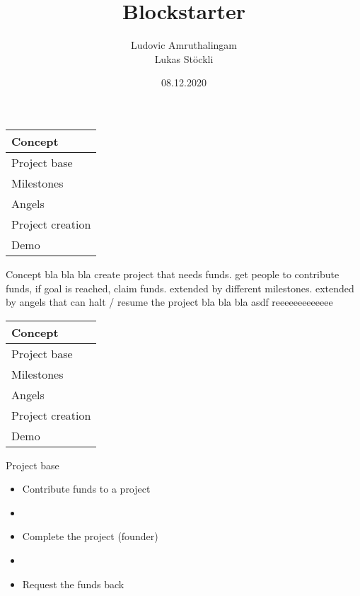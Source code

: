 \documentclass{beamer}
\title              {Blockstarter}
\author             {Ludovic Amruthalingam\\Lukas Stöckli}
\institute          {University of Basel}
\date               {08.12.2020}
\begin{document}
\begin{frame}[t,plain]
	\titlepage
\end{frame}




\begin{frame}
	\begin{tabularx}{\textwidth}{X}
		\hline
		\rowcolor{hcolor}
		Concept\\
		\hline
		Project base\\
		\hline
		Milestones\\
		\hline
		Angels\\
		\hline
		Project creation\\
		\hline
		Demo\\
		\hline
	\end{tabularx}
\end{frame}




\begin{frame}{Concept}
bla bla bla create project that needs funds. get people to contribute funds, if goal is reached, claim funds. extended by different milestones. extended by angels that can halt / resume the project bla bla bla asdf reeeeeeeeeeeee
\end{frame}


\begin{frame}
	\begin{tabularx}{\textwidth}{X}
		\hline
		Concept\\
		\hline
		\rowcolor{hcolor}
		Project base\\
		\hline
		Milestones\\
		\hline
		Angels\\
		\hline
		Project creation\\
		\hline
		Demo\\
		\hline
	\end{tabularx}
\end{frame}


\begin{frame}{Project base}
\begin{itemize}
	\item Contribute funds to a project
	\item[]
	\item Complete the project (founder)
	\item[]
	\item Request the funds back
\end{itemize}
\end{frame}
\end{document}
